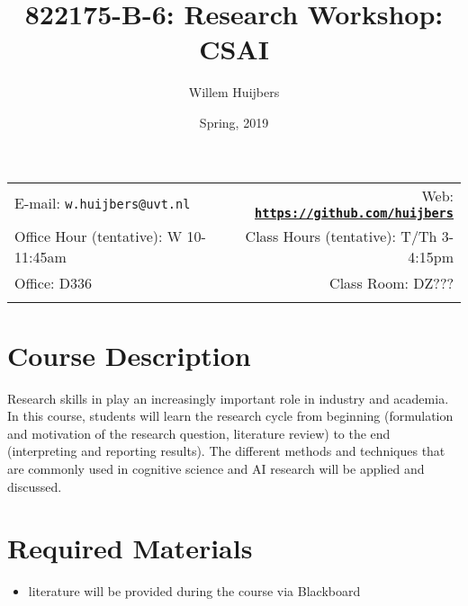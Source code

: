 \documentclass[11pt]{article}
\title{822175-B-6: Research Workshop: CSAI}
\author{Willem Huijbers}
\date{Spring, 2019}
\newcommand{\blankline}{\quad\pagebreak[2]}
\begin{document}
\maketitle

\blankline

\begin{tabular*}{.93\textwidth}{@{\extracolsep{\fill}}lr}


E-mail: \texttt{w.huijbers@uvt.nl} & Web: \href{https://github.com/huijbers}{\tt\bf https://github.com/huijbers}  \\

Office Hour (tentative): W 10-11:45am  &  Class Hours (tentative): T/Th 3-4:15pm \\

 Office: D336 & Class Room: DZ??? \\

&  \\
\hline
\end{tabular*}

\vspace{5 mm}


\section*{Course Description}

Research skills in play an increasingly important role in industry and academia. In this course, students will learn the research cycle from beginning (formulation and motivation of the research question, literature review) to the end (interpreting and reporting results). The different methods and techniques that are commonly used in cognitive science and AI research will be applied and discussed.
\bigskip

\section*{Required Materials}
\begin{itemize}
\item literature will be provided during the course via Blackboard 
\end{itemize}
\end{document}
